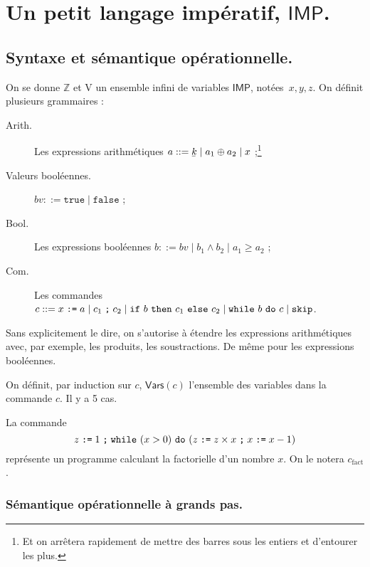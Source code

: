 \documentclass[../main]{subfiles}
\begin{document}
  \chapter{Un petit langage impératif, $\mathsf{IMP}$.} \label{thprog-chap08}
  \minitoc

  \section{Syntaxe et sémantique opérationnelle.}
  On se donne $\mathds{Z}$ et $\mathrm{V}$ un ensemble infini de variables $\mathsf{IMP}$, notées~$x, y, z$.
  On définit plusieurs grammaires :

  \begin{description}
    \item[Arith.] Les expressions arithmétiques $a ::= \ubar{k}  \mid a_1 \oplus a_2  \mid x$ ;\footnote{Et on arrêtera rapidement de mettre des barres sous les entiers et d'entourer les plus.}\showfootnote
    \item[Valeurs booléennes.] $bv ::= \mathtt{true}  \mid \mathtt{false}$ ;
    \item[Bool.] Les expressions booléennes $b ::= bv  \mid b_1 \land b_2  \mid a_1 \ge a_2$ ;
    \item[Com.] Les commandes $c ::= x \mathrel{\texttt{:=}} a  \mid c_1 \mathrel{\texttt{;}} c_2  \mid \texttt{if}\ b\ \texttt{then}\ c_1\ \texttt{else}\ c_2  \mid \texttt{while}\ b\ \texttt{do}\ c  \mid \texttt{skip}$.
  \end{description}

  Sans explicitement le dire, on s'autorise à étendre les expressions arithmétiques avec, par exemple, les produits, les soustractions.
  De même pour les expressions booléennes.

  On définit, par induction sur $c$, $\mathsf{Vars}(c)$ l'ensemble des variables dans la commande $c$. Il y a 5 cas.

  \begin{exm}
    La commande \[
      z \mathrel{\texttt{:=}} 1 \mathrel{\texttt{;}} \texttt{while}\ (x > 0)\ \texttt{do}\ (z \mathrel{\texttt{:=}} z \times x \mathrel{\texttt{;}} x \mathrel{\texttt{:=}} x - 1)
    \]
    représente un programme calculant la factorielle d'un nombre $x$.
    On le notera $c_\text{fact}$.
  \end{exm}

  \subsection{Sémantique opérationnelle à grands pas.}
\end{document}

